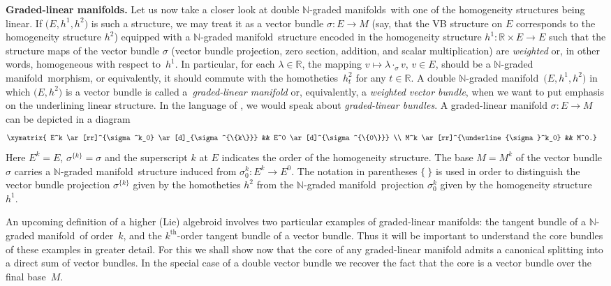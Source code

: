 \documentclass[pdftex]{sigma}
\newcommand{\grB}{{$\N$-graded manifold}}
\newcommand{\grBs}{{$\N$-graded manifolds}}
\newcommand{\degree}{{order}}
\newcommand{\thh}[1]{#1^{\mathrm{th}}} %
\newcommand{\R}{\mathbb{R}}
\newcommand{\N}{\mathbb{N}}
\newcommand{\ra}{\rightarrow}
\numberwithin{equation}{section}
\theoremstyle{definition}
\begin{document}
{\bf Graded-linear manifolds.}
 Let us now take a closer look at double \grBs\ with one of the homogeneity structures being linear. If $\big(E,h^1,h^2\big)$ is such a structure, we may treat it as a vector bundle $\sigma\colon E\ra M$ (say, that the VB structure on $E$ corresponds to the homogeneity structure $h^2$) equipped with a \grB\ structure encoded in the homogeneity structure $h^1\colon \R \times E\ra E$ such that the structure maps of the vector bundle $\sigma$ (vector bundle projection, zero section, addition, and scalar multiplication) are \emph{weighted} or, in other words, homogeneous with respect to~$h^1$. In particular, for each $\lambda\in \R$, the mapping $v \mapsto \lambda \cdot_{\sigma} v$, $v\in E$, should be a \grB\ morphism, or equivalently, it should commute with the homotheties~$h^2_t$ for any $t\in \R$. A double \grB\ $\big(E, h^1, h^2\big)$ in which $\big(E, h^2\big)$ is a vector bundle is called a~\emph{graded-linear manifold} or, equivalently, a \emph{weighted vector bundle}, when we want to put emphasis on the underlining linear structure. In the language of \cite{BGG}, we would speak about \emph{graded-linear bundles}. A graded-linear manifold $\sigma\colon E\ra M$ can be depicted in a diagram
\begin{gather}\label{d:gr_lin_bndl}\begin{split}&
\xymatrix{
E^k \ar[rr]^{\sigma^k_0} \ar[d]_{\sigma^{\{k\}}} && E^0 \ar[d]^{\sigma^{\{0\}}} \\
M^k \ar[rr]^{\underline{\sigma}^k_0} && M^0.}\end{split}
\end{gather}
Here $E^k = E$, $\sigma^{\{k\}} = \sigma$ and the superscript $k$ at $E$ indicates the order of the homogeneity structure. The base $M = M^k$ of the vector bundle $\sigma$ carries a \grB\ structure induced from $\sigma^k_0\colon E^k\ra E^0$. The notation in parentheses $\{ \ \}$ is used in order to distinguish the vector bundle projection $\sigma^{\{k\}}$ given by the homotheties $h^2$ from the \grB\ projection $\sigma^k_0$ given by the homogeneity structure~$h^1$.

An upcoming definition of a higher (Lie) algebroid involves two particular examples of graded-linear manifolds: the tangent bundle of a \grB\ of \degree\ $k$, and the $\thh{k}$-order tangent bundle of a vector bundle. Thus it will be important to understand the core bundles of these examples in greater detail. For this we shall show now that the core of any graded-linear manifold admits a canonical splitting into a direct sum of vector bundles. In the special case of a double vector bundle we recover the fact that the core is a vector bundle over the final base~$M$.
\end{document}
